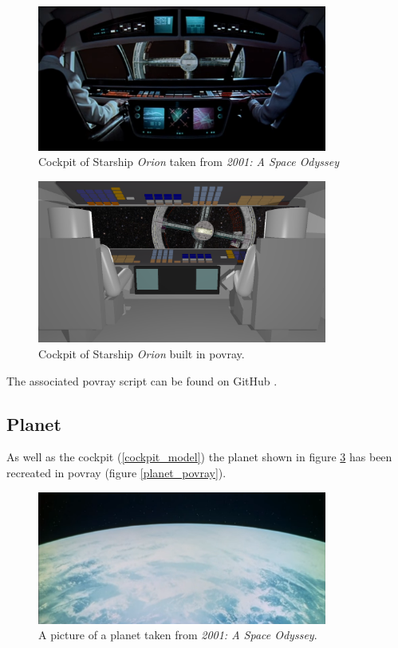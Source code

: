 \begin{figure}[ht]
	\centering
	\includegraphics[width=0.85\textwidth]{images/original_cockpit.png}
	\caption{Cockpit of Starship \textit{Orion} taken from \textit{2001: A Space Odyssey}}
	\label{cockpit_original}
\end{figure}

\begin{figure}[ht]
	\centering
	\includegraphics[width=0.85\textwidth]{images/scene19587.png}
	\caption{Cockpit of Starship \textit{Orion} built in povray.}
	\label{cockpit_povray}
\end{figure}

The associated povray script can be found on GitHub \cite{Quving}.

\newpage
\subsection{Planet}
As well as the cockpit (\ref{cockpit_model}) the planet shown in figure \ref{planet_original} has been recreated in povray (figure \ref{planet_povray}).
\begin{figure}[ht]
	\centering
	\includegraphics[width=0.85\textwidth]{images/original_planet.png}
	\caption{A picture of a planet taken from \textit{2001: A Space Odyssey}.}
	\label{planet_original}
\end{figure}

